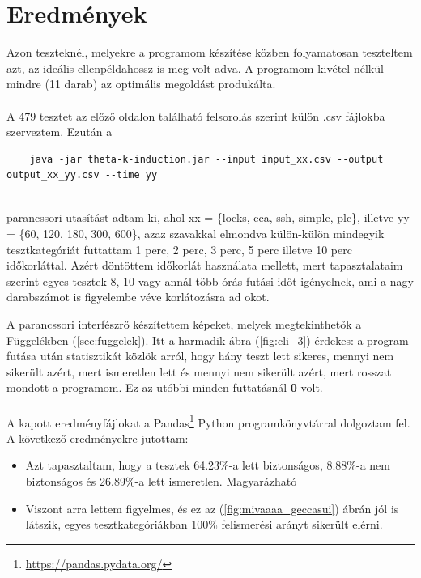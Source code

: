 \section{Eredmények}
\label{sec:kiertekeles_ered}

Azon teszteknél, melyekre a programom készítése közben folyamatosan teszteltem azt, az ideális ellenpéldahossz is meg volt adva. A programom kivétel nélkül mindre (11 darab) az optimális megoldást produkálta. 
\\
\\
A 479 tesztet az előző oldalon található felsorolás szerint külön .csv fájlokba szerveztem. Ezután a 
\ \\
\begin{lstlisting}
	java -jar theta-k-induction.jar --input input_xx.csv --output output_xx_yy.csv --time yy
\end{lstlisting}
\ \\
parancssori utasítást adtam ki, ahol xx = \{locks, eca, ssh, simple, plc\}, illetve yy = \{60, 120, 180, 300, 600\}, azaz szavakkal elmondva külön-külön mindegyik tesztkategóriát futtattam 1 perc, 2 perc, 3 perc, 5 perc illetve 10 perc időkorláttal. Azért döntöttem időkorlát használata mellett, mert tapasztalataim szerint egyes tesztek 8, 10 vagy annál több órás futási időt igényelnek, ami a nagy darabszámot is figyelembe véve korlátozásra ad okot. 

A parancssori interfészrő készítettem képeket, melyek megtekinthetők a Függelékben (\ref{sec:fuggelek}). Itt a harmadik ábra (\ref{fig:cli_3}) érdekes: a program futása után statisztikát közlök arról, hogy hány teszt lett sikeres, mennyi nem sikerült azért, mert ismeretlen lett és mennyi nem sikerült azért, mert rosszat mondott a programom. Ez az utóbbi minden futtatásnál \textbf{0} volt.
\\
\\
A kapott eredményfájlokat a Pandas\footnote{\url{https://pandas.pydata.org/}} Python programkönyvtárral dolgoztam fel. A következő eredményekre jutottam:

\begin{itemize}
	\item Azt tapasztaltam, hogy a tesztek 64.23\%-a lett biztonságos, 8.88\%-a nem biztonságos és 26.89\%-a lett ismeretlen. Magyarázható 
	\item Viszont arra lettem figyelmes, és ez az (\ref{fig:mivaaaa_geccasui}) ábrán jól is látszik, egyes tesztkategóriákban 100\% felismerési arányt sikerült elérni.
\end{itemize}

